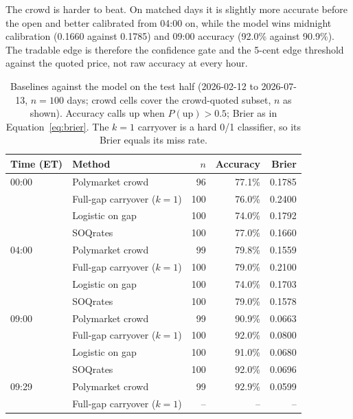 The crowd is
harder to beat. On matched days it is slightly more accurate before the open
and better calibrated from 04:00 on, while the model wins midnight
calibration (0.1660 against 0.1785) and 09:00 accuracy (92.0\% against
90.9\%). The tradable edge is therefore the confidence gate and the 5-cent
edge threshold against the quoted price, not raw accuracy at every hour.

\begin{table}[h]
    \centering
    \small
    \caption{Baselines against the model on the test half (2026-02-12 to
    2026-07-13, $n=100$ days; crowd cells cover the crowd-quoted subset,
    $n$ as shown). Accuracy calls up when $P(\text{up})>0.5$; Brier as in
    Equation~\ref{eq:brier}. The $k{=}1$ carryover is a hard 0/1 classifier,
    so its Brier equals its miss rate.}
    \label{tab:baselines}
    \begin{tabular}{llrrr}
        \toprule
        Time (ET) & Method & $n$ & Accuracy & Brier \\
        \midrule
        00:00 & Polymarket crowd             & 96  & 77.1\% & 0.1785 \\
              & Full-gap carryover ($k{=}1$) & 100 & 76.0\% & 0.2400 \\
              & Logistic on gap              & 100 & 74.0\% & 0.1792 \\
              & SOQrates                     & 100 & 77.0\% & 0.1660 \\
        \midrule
        04:00 & Polymarket crowd             & 99  & 79.8\% & 0.1559 \\
              & Full-gap carryover ($k{=}1$) & 100 & 79.0\% & 0.2100 \\
              & Logistic on gap              & 100 & 74.0\% & 0.1703 \\
              & SOQrates                     & 100 & 79.0\% & 0.1578 \\
        \midrule
        09:00 & Polymarket crowd             & 99  & 90.9\% & 0.0663 \\
              & Full-gap carryover ($k{=}1$) & 100 & 92.0\% & 0.0800 \\
              & Logistic on gap              & 100 & 91.0\% & 0.0680 \\
              & SOQrates                     & 100 & 92.0\% & 0.0696 \\
        \midrule
        09:29 & Polymarket crowd             & 99  & 92.9\% & 0.0599 \\
              & Full-gap carryover ($k{=}1$) & --  & --     & --     \\

\end{tabular}
\end{table}

